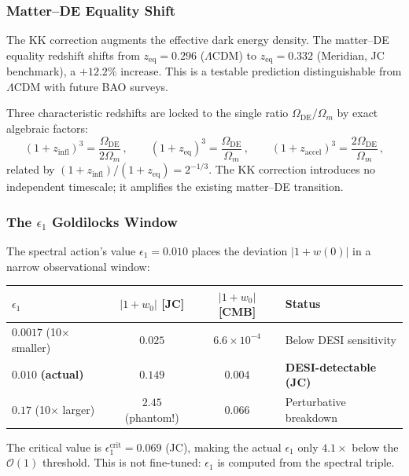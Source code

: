 \subsubsection{Matter--DE Equality Shift}

The KK correction augments the effective dark energy density. The matter--DE equality redshift shifts from $z_{\mathrm{eq}} = 0.296$ ($\Lambda$CDM) to $z_{\mathrm{eq}} = 0.332$ (Meridian, JC benchmark), a $+12.2\%$ increase. This is a testable prediction distinguishable from $\Lambda$CDM with future BAO surveys.

Three characteristic redshifts are locked to the single ratio $\Omega_{\mathrm{DE}}/\Omega_m$ by exact algebraic factors:
\begin{equation}
  (1 + z_{\mathrm{infl}})^3 = \frac{\Omega_{\mathrm{DE}}}{2\Omega_m}\,,\qquad
  (1 + z_{\mathrm{eq}})^3 = \frac{\Omega_{\mathrm{DE}}}{\Omega_m}\,,\qquad
  (1 + z_{\mathrm{accel}})^3 = \frac{2\Omega_{\mathrm{DE}}}{\Omega_m}\,,
  \label{eq:app-coinc-redshifts}
\end{equation}
related by $(1 + z_{\mathrm{infl}})/(1 + z_{\mathrm{eq}}) = 2^{-1/3}$. The KK correction introduces no independent timescale; it amplifies the existing matter--DE transition.

\subsubsection{The $\epsilon_1$ Goldilocks Window}

The spectral action's value $\epsilon_1 = 0.010$ places the deviation $|1+w(0)|$ in a narrow observational window:

\begin{center}
\small
\begin{tabular}{l c c l}
\hline
$\epsilon_1$ & $|1+w_0|$ [JC] & $|1+w_0|$ [CMB] & Status \\
\hline
$0.0017$ (10$\times$ smaller) & $0.025$ & $6.6 \times 10^{-4}$ & Below DESI sensitivity \\
$\mathbf{0.010}$ \textbf{(actual)} & $\mathbf{0.149}$ & $\mathbf{0.004}$ & \textbf{DESI-detectable (JC)} \\
$0.17$ (10$\times$ larger) & $2.45$ (phantom!) & $0.066$ & Perturbative breakdown \\
\hline
\end{tabular}
\end{center}

\noindent
The critical value is $\epsilon_1^{\mathrm{crit}} = 0.069$ (JC), making the actual $\epsilon_1$ only $4.1\times$ below the $\mathcal{O}(1)$ threshold. This is not fine-tuned: $\epsilon_1$ is computed from the spectral triple.

